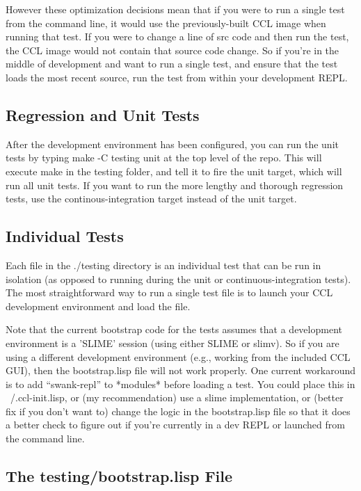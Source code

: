 \documentclass[12pt]{article} %
\begin{document}
However these optimization decisions mean that if you were to run a single test from the command line, it would use the previously-built CCL image when running that test.
If you were to change a line of src code and then run the test, the CCL image would not contain that source code change.
So if you're in the middle of development and want to run a single test, and ensure that the test loads the most recent source, run the test from within your development REPL.

\subsection{Regression and Unit Tests}

After the development environment has been configured, you can run the unit tests by typing make -C testing unit at the top level of the repo.
This will execute make in the testing folder, and tell it to fire the unit target, which will run all unit tests.
If you want to run the more lengthy and thorough regression tests, use the continous-integration target instead of the unit target.

\subsection{Individual Tests}

Each file in the ./testing directory is an individual test that can be run in isolation (as opposed to running during the unit or continuous-integration tests).
The most straightforward way to run a single test file is to launch your CCL development environment and load the file.

Note that the current bootstrap code for the tests assumes that a development environment is a 'SLIME' session (using either SLIME or slimv).
So if you are using a different development environment (e.g., working from the included CCL GUI), then the bootstrap.lisp file will not work properly.
One current workaround is to add ``swank-repl'' to *modules* before loading a test.
You could place this in ~/.ccl-init.lisp, or (my recommendation) use a slime implementation, or
(better fix if you don't want to) change the logic in the bootstrap.lisp file so that it does a better check to figure out if you're currently in a dev REPL or launched from the command line.

\subsection{The testing/bootstrap.lisp File}
\end{document}
